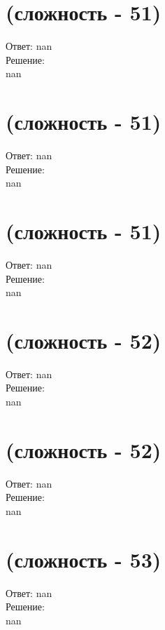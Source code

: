 \documentclass[a4paper,11pt]{article}%
\begin{document}
%
\section{(сложность {-} 51)}%
\label{sec:( {-} 51)}%
\hspace{3ex} Ответ: nan \\%
%
\hspace*{3ex} Решение: \\%
nan

%
\section{(сложность {-} 51)}%
\label{sec:( {-} 51)}%
\hspace{3ex} Ответ: nan \\%
%
\hspace*{3ex} Решение: \\%
nan

%
\section{(сложность {-} 51)}%
\label{sec:( {-} 51)}%
\hspace{3ex} Ответ: nan \\%
%
\hspace*{3ex} Решение: \\%
nan

%
\section{(сложность {-} 52)}%
\label{sec:( {-} 52)}%
\hspace{3ex} Ответ: nan \\%
%
\hspace*{3ex} Решение: \\%
nan

%
\section{(сложность {-} 52)}%
\label{sec:( {-} 52)}%
\hspace{3ex} Ответ: nan \\%
%
\hspace*{3ex} Решение: \\%
nan

%
\section{(сложность {-} 53)}%
\label{sec:( {-} 53)}%
\hspace{3ex} Ответ: nan \\%
%
\hspace*{3ex} Решение: \\%
nan
\end{document}
